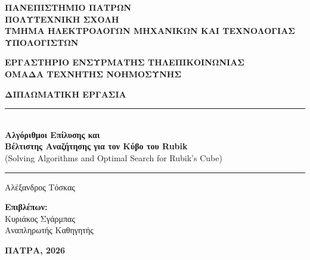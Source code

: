 
\begin{titlepage}
\begin{center}

\vspace*{1cm}

\textbf{\Large ΠΑΝΕΠΙΣΤΗΜΙΟ ΠΑΤΡΩΝ}\\[0.3cm]
\textbf{\large ΠΟΛΥΤΕΧΝΙΚΗ ΣΧΟΛΗ}\\[0.2cm]
\textbf{\large ΤΜΗΜΑ ΗΛΕΚΤΡΟΛΟΓΩΝ ΜΗΧΑΝΙΚΩΝ ΚΑΙ ΤΕΧΝΟΛΟΓΙΑΣ ΥΠΟΛΟΓΙΣΤΩΝ}\\[0.5cm]

\vspace{1cm}

\textbf{\large ΕΡΓΑΣΤΗΡΙΟ ΕΝΣΥΡΜΑΤΗΣ ΤΗΛΕΠΙΚΟΙΝΩΝΙΑΣ}\\
\textbf{\large ΟΜΑΔΑ ΤΕΧΝΗΤΗΣ ΝΟΗΜΟΣΥΝΗΣ}

\vspace{2cm}

\textbf{\Large ΔΙΠΛΩΜΑΤΙΚΗ ΕΡΓΑΣΙΑ}

\vspace{1.5cm}

\rule{\textwidth}{0.4pt}\\[0.5cm]
{\LARGE \textbf{Αλγόριθμοι Επίλυσης και\\Βέλτιστης Αναζήτησης για τον Κύβο του Rubik}}\\[0.3cm]
{\large (Solving Algorithms and Optimal Search for Rubik's Cube)}\\[0.5cm]
\rule{\textwidth}{0.4pt}

\vspace{2cm}

{\Large Αλέξανδρος Τόσκας}

\vspace{2cm}

\textbf{Επιβλέπων:}\\
Κυριάκος Σγάρμπας\\
Αναπληρωτής Καθηγητής

\vfill

\textbf{ΠΑΤΡΑ, 2026}

\end{center}
\end{titlepage}

